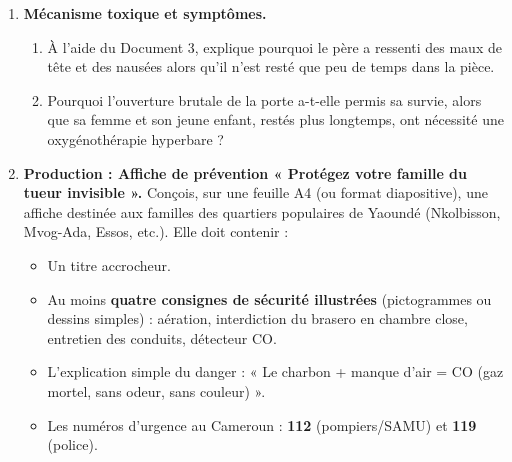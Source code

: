 \documentclass[11pt]{article}
\begin{document}
\begin{enumerate}
    \item \textbf{Mécanisme toxique et symptômes.}
    \begin{enumerate}
        \item À l'aide du Document 3, explique pourquoi le père a ressenti des maux de tête et des nausées alors qu'il n'est resté que peu de temps dans la pièce.
        \item Pourquoi l'ouverture brutale de la porte a-t-elle permis sa survie, alors que sa femme et son jeune enfant, restés plus longtemps, ont nécessité une oxygénothérapie hyperbare ?
    \end{enumerate}
    
    \item \textbf{Production : Affiche de prévention « Protégez votre famille du tueur invisible ».}
    Conçois, sur une feuille A4 (ou format diapositive), une affiche destinée aux familles des quartiers populaires de Yaoundé (Nkolbisson, Mvog-Ada, Essos, etc.). Elle doit contenir :
    \begin{itemize}
        \item Un titre accrocheur.
        \item Au moins \textbf{quatre consignes de sécurité illustrées} (pictogrammes ou dessins simples) : aération, interdiction du brasero en chambre close, entretien des conduits, détecteur CO.
        \item L'explication simple du danger : « Le charbon + manque d'air = CO (gaz mortel, sans odeur, sans couleur) ».
        \item Les numéros d'urgence au Cameroun : \textbf{112} (pompiers/SAMU) et \textbf{119} (police).
    \end{itemize}
\end{enumerate}
\end{document}
